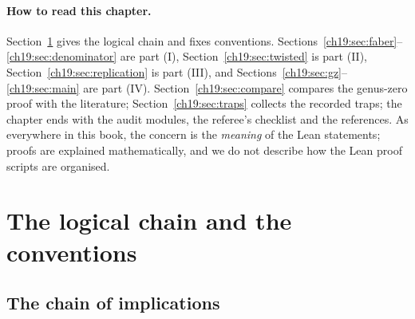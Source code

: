 \paragraph{How to read this chapter.}  Section~\ref{ch19:sec:overview} gives the logical chain and fixes conventions.
Sections~\ref{ch19:sec:faber}--\ref{ch19:sec:denominator} are part (I), Section~\ref{ch19:sec:twisted} is part (II),
Section~\ref{ch19:sec:replication} is part (III), and Sections~\ref{ch19:sec:gz}--\ref{ch19:sec:main} are part (IV).
Section~\ref{ch19:sec:compare} compares the genus-zero proof with the literature; Section~\ref{ch19:sec:traps} collects
the recorded traps; the chapter ends with the audit modules, the referee's checklist and the references.  As
everywhere in this book, the concern is the \emph{meaning} of the Lean statements; proofs are explained mathematically,
and we do not describe how the Lean proof scripts are organised.

\section{The logical chain and the conventions}\label{ch19:sec:overview}

\subsection{The chain of implications}

